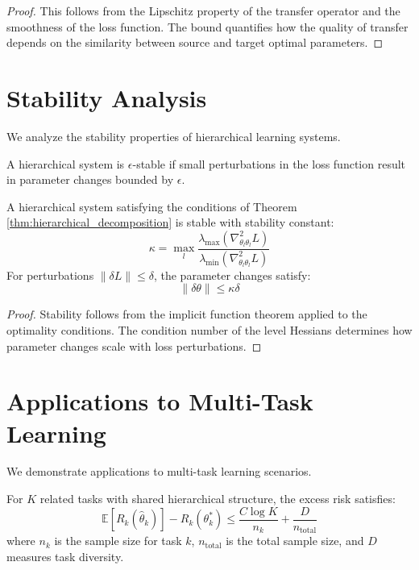 \begin{proof}
This follows from the Lipschitz property of the transfer operator and the smoothness of the loss function. The bound quantifies how the quality of transfer depends on the similarity between source and target optimal parameters.
\end{proof}

\section{Stability Analysis}

We analyze the stability properties of hierarchical learning systems.

\begin{definition}
\label{def:system_stability}
A hierarchical system is $\epsilon$-stable if small perturbations in the loss function result in parameter changes bounded by $\epsilon$.
\end{definition}

\begin{theorem}
\label{thm:hierarchical_stability}
A hierarchical system satisfying the conditions of Theorem \ref{thm:hierarchical_decomposition} is stable with stability constant:
$$\kappa = \max_l \frac{\lambda_{\max}(\nabla^2_{\theta_l \theta_l} L)}{\lambda_{\min}(\nabla^2_{\theta_l \theta_l} L)}$$
For perturbations $\|\delta L\| \leq \delta$, the parameter changes satisfy:
$$\|\delta \theta\| \leq \kappa \delta$$
\end{theorem}

\begin{proof}
Stability follows from the implicit function theorem applied to the optimality conditions. The condition number of the level Hessians determines how parameter changes scale with loss perturbations.
\end{proof}

\section{Applications to Multi-Task Learning}

We demonstrate applications to multi-task learning scenarios.

\begin{theorem}
\label{thm:multitask_performance}
For $K$ related tasks with shared hierarchical structure, the excess risk satisfies:
$$\mathbb{E}[R_k(\hat{\theta}_k)] - R_k(\theta_k^*) \leq \frac{C \log K}{n_k} + \frac{D}{n_{\text{total}}}$$
where $n_k$ is the sample size for task $k$, $n_{\text{total}}$ is the total sample size, and $D$ measures task diversity.
\end{theorem}

